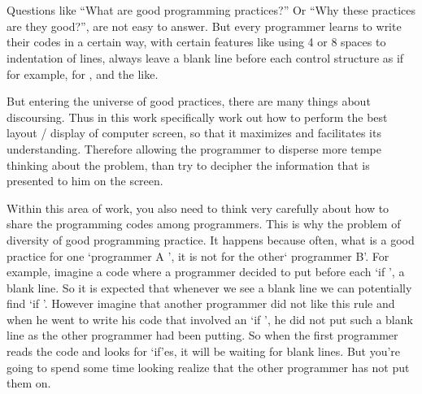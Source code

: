 

%
\cleardoublepage
{}


\chapter{}


\chooselang
{
    Questions like ``What are good programming practices?'' Or ``Why these practices
    are they good?'', are not easy to answer. But every programmer learns to write their codes
    in a certain way, with certain features like using 4 or 8 spaces to
    indentation of lines, always leave a blank line before each control structure as
    if for example, for \textquotesingle, and the like.

    But entering the universe of good practices, there are many things about discoursing. Thus in this work
    specifically work out how to perform the best layout / display of
    computer screen, so that it maximizes and facilitates its understanding.
    Therefore allowing the programmer to disperse more tempe thinking about the problem, than
    try to decipher the information that is presented to him on the screen.

    Within this area of work, you also need to think very carefully about how to share the
    programming codes among programmers. This is why the problem of
    diversity of good programming practice. It happens because often, what is a
    good practice for one `programmer A ', it is not for the other` programmer B'. For example, imagine a
    code where a programmer decided to put before each `if ', a blank line. So it is
    expected that whenever we see a blank line we can potentially find
    `if '. However imagine that another programmer did not like this rule and when he went to write
    his code that involved an `if ', he did not put such a blank line as the other
    programmer had been putting. So when the first programmer reads the code and looks for
    `if'es, it will be waiting for blank lines. But you're going to spend some time looking
    realize that the other programmer has not put them on.

}
